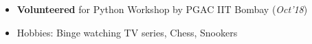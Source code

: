 \documentclass[10pt]{article}
\begin{document}
\vspace{0.1cm}

\colorbox{bl}{}
\vspace{-0.5cm}
\begin{itemize}[leftmargin=0.4cm]
    \item \textbf{Volunteered} for Python Workshop by PGAC IIT Bombay \hfill{(\textit{Oct'18})}\vspace{-0.2cm}
    \item {Hobbies: Binge watching TV series, Chess, Snookers}

    
\end{itemize}

\end{document}
